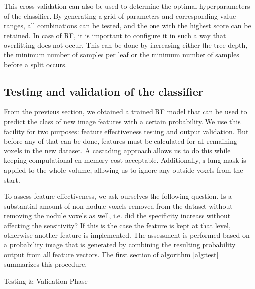 This cross validation can also be used to determine the optimal hyperparameters
of the classifier. By generating a grid of parameters and corresponding value
ranges, all combinations can be tested, and the one with the highest score can
be retained. In case of RF, it is important to configure it in such a way that
overfitting does not occur. This can be done by increasing either the tree
depth, the minimum number of samples per leaf or the minimum number of samples
before a split occurs.


\subsection{Testing and validation of the classifier}
From the previous section, we obtained a trained RF model that can be used to
predict the class of new image features with a certain probability. We use this
facility for two purposes: feature effectiveness testing and output validation.
But before any of that can be done, features must be calculated for all
remaining voxels in the new dataset. A cascading approach allows us to do this
while keeping computational en memory cost acceptable. Additionally, a lung mask
is applied to the whole volume, allowing us to ignore any outside voxels from
the start.

To assess feature effectiveness, we ask ourselves the following question. Is a
substantial amount of non-nodule voxels removed from the dataset without
removing the nodule voxels as well, i.e. did the specificity increase without
affecting the sensitivity? If this is the case the feature is kept at that
level, otherwise another feature is implemented. The assessment is performed
based on a probability image that is generated by combining the resulting
probability output from all feature vectors. The first section of algorithm
\ref{alg:test} summarizes this procedure.

\begin{algorithm}[htp]
	\DontPrintSemicolon
	\caption{Testing \& Validation Phase\label{alg:test}}
\end{algorithm}

